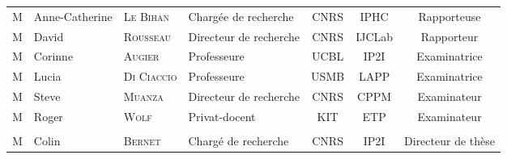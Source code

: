 {\small

\begin{tabular}{llllccc}
M\up{me}\!\!\!\! & Anne-Catherine \!\! & \textsc{Le Bihan} & Chargée de recherche & CNRS & IPHC & Rapporteuse\\
M & David & \textsc{Rousseau} & Directeur de recherche & CNRS & IJCLab & Rapporteur\\
M\up{me}\!\!\!\! & Corinne & \textsc{Augier} & Professeure & UCBL & IP2I & Examinatrice\\
M\up{me}\!\!\!\! & Lucia & \textsc{Di Ciaccio} & Professeure & USMB & LAPP & Examinatrice\\
M & Steve & \textsc{Muanza} & Directeur de recherche & CNRS & CPPM & Examinateur\\
M & Roger & \textsc{Wolf} & Privat-docent & KIT  & ETP & Examinateur\\
\\
M & Colin & \textsc{Bernet} & Chargé de recherche & CNRS & IP2I & Directeur de thèse \\
\end{tabular}

}
